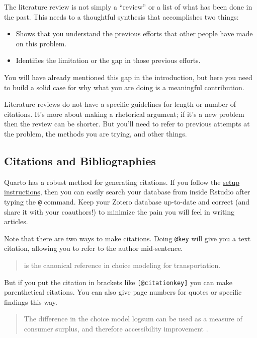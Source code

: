 \documentclass[
  letterpaper,
  authoryear]{elsarticle}
\providecommand{\tightlist}{%
  \setlength{\itemsep}{0pt}\setlength{\parskip}{0pt}}\usepackage{longtable,booktabs,array}
\begin{document}
The literature review is not simply a ``review'' or a list of what has
been done in the past. This needs to a thoughtful synthesis that
accomplishes two things:

\begin{itemize}
\tightlist
\item
  Shows that you understand the previous efforts that other people have
  made on this problem.
\item
  Identifies the limitation or the gap in those previous efforts.
\end{itemize}

You will have already mentioned this gap in the introduction, but here
you need to build a solid case for why what you are doing is a
meaningful contribution.

Literature reviews do not have a specific guidelines for length or
number of citations. It's more about making a rhetorical argument; if
it's a new problem then the review can be shorter. But you'll need to
refer to previous attempts at the problem, the methods you are trying,
and other things.

\subsection{Citations and
Bibliographies}\label{citations-and-bibliographies}

Quarto has a robust method for generating citations. If you follow the
\href{https://quarto.org/docs/visual-editor/technical.html\#citations-from-zotero}{setup
instructions}, then you can easily search your database from inside
Rstudio after typing the \texttt{@} command. Keep your Zotero database
up-to-date and correct (and share it with your coauthors!) to minimize
the pain you will feel in writing articles.

Note that there are two ways to make citations. Doing \texttt{@key} will
give you a text citation, allowing you to refer to the author
mid-sentence.

\begin{quote}
\citet{ben-akivaDiscreteChoiceAnalysis1985} is the canonical reference
in choice modeling for transportation.
\end{quote}

But if you put the citation in brackets like \texttt{{[}@citationkey{]}}
you can make parenthetical citations. You can also give page numbers for
quotes or specific findings this way.

\begin{quote}
The difference in the choice model logsum can be used as a measure of
consumer surplus, and therefore accessibility improvement
\citep[p.~301]{ben-akivaDiscreteChoiceAnalysis1985}.
\end{quote}
\end{document}
